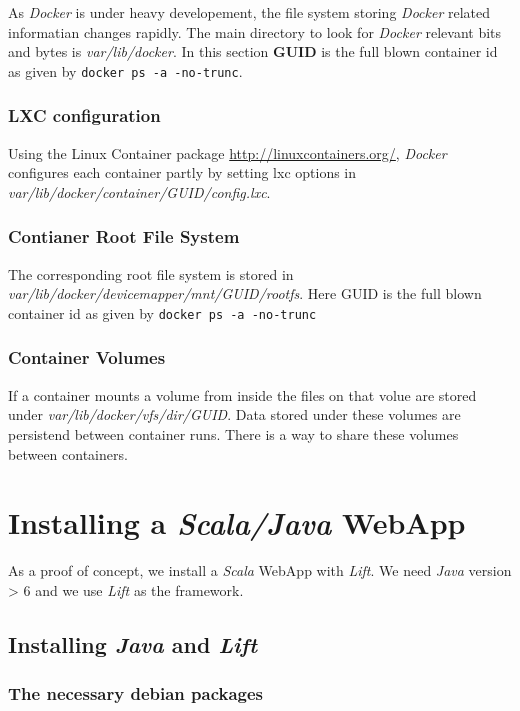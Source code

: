 \documentclass[11pt]{article}
\begin{document}
As \emph{Docker} is under heavy developement, the file system storing \emph{Docker} related informatian changes rapidly. The main directory to look for \emph{Docker} relevant bits and bytes is \emph{var/lib/docker}. In this section \textbf{GUID} is the full blown container id as given by \texttt{docker ps -a -no-trunc}.
\subsubsection{LXC configuration}
\label{sec-2-5-1}

Using the Linux Container package \href{file://./lxc/}{http://linuxcontainers.org/}, \emph{Docker} configures each container partly by setting lxc options in \emph{var/lib/docker/container/GUID/config.lxc}. 
\subsubsection{Contianer Root File System}
\label{sec-2-5-2}

The corresponding root file system is stored in \emph{var/lib/docker/devicemapper/mnt/GUID/rootfs}.
Here GUID is the full blown container id as given by \texttt{docker ps -a -no-trunc}  
\subsubsection{Container Volumes}
\label{sec-2-5-3}

If a container mounts a volume from inside the files on that volue are stored under \emph{var/lib/docker/vfs/dir/GUID}. Data stored under these volumes are persistend between container runs. There is a way to share these volumes between containers. 
\section{Installing a \emph{Scala/Java} WebApp}
\label{sec-3}

As a proof of concept, we install a \emph{Scala} WebApp with \emph{Lift}. We need \emph{Java} version > 6 and we use \emph{Lift} as the framework. 
\subsection{Installing \emph{Java} and \emph{Lift}}
\label{sec-3-1}
\subsubsection{The necessary debian packages}
\label{sec-3-1-1}
\end{document}
